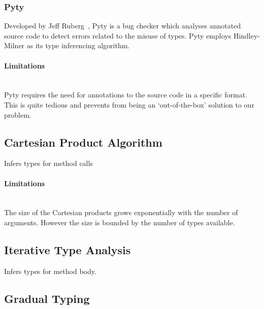 \documentclass[12pt, titlepage]{article}
\begin{document}
\subsubsection{Pyty}
Developed by Jeff Ruberg~\cite{pyty}, Pyty is a bug checker which analyses annotated source code to detect errors related to the misuse of types. Pyty employs Hindley-Milner as its type inferencing algorithm.
\paragraph{Limitations}\mbox{}\\
Pyty requires the need for annotations to the source code in a specific format. This is quite tedious and prevents from being an `out-of-the-box' solution to our problem.



\subsection{Cartesian Product Algorithm}
Infers types for method calls
\paragraph*{Limitations}\mbox{}\\
The size of the Cartesian products grows exponentially with the number of arguments. However the size is bounded by the number of types available.

\subsection{Iterative Type Analysis}
Infers types for method body.

\subsection{Gradual Typing}
\end{document}
